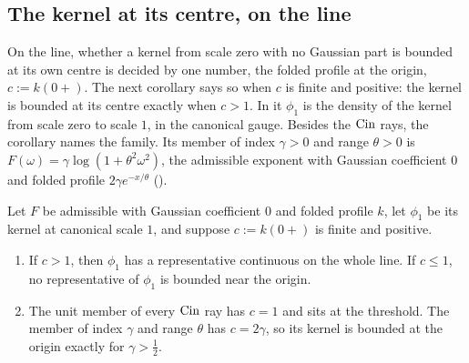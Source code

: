 \subsection{The kernel at its centre, on the line}\label{sec:line-origin}

On the line, whether a kernel from scale zero with no Gaussian part is bounded at its own centre
is decided by one number, the folded profile at the origin, $c := k(0{+})$. The next corollary
says so when $c$ is finite and positive: the kernel is bounded at its centre exactly when
$c > 1$. In it $\phi_1$ is the density of the kernel from scale zero to scale $1$, in the
canonical gauge. Besides the $\operatorname{Cin}$ rays, the corollary names the \Matern{} family. Its member of
index $\gamma > 0$ and range $\theta > 0$ is $F(\omega) = \gamma\log(1 + \theta^2\omega^2)$, the
admissible exponent with Gaussian coefficient $0$ and folded profile $2\gamma e^{-x/\theta}$
().

\begin{corollary}\label{cor:line-threshold}
Let $F$ be admissible with Gaussian coefficient $0$ and folded profile $k$, let $\phi_1$ be its
kernel at canonical scale $1$, and suppose $c := k(0{+})$ is finite and positive.
\begin{enumerate}
\item If $c > 1$, then $\phi_1$ has a representative continuous on the whole line. If $c \le 1$,
no representative of $\phi_1$ is bounded near the origin.
\item The unit member of every $\operatorname{Cin}$ ray has $c = 1$ and sits at the threshold. The \Matern{}
member of index $\gamma$ and range $\theta$ has $c = 2\gamma$, so its kernel is bounded at the
origin exactly for $\gamma > \tfrac12$.
\end{enumerate}
\end{corollary}

